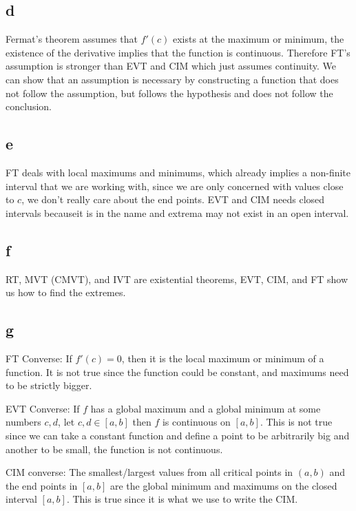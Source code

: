 \documentclass[12pt]{article}
\begin{document}
\subsection{d}
Fermat's theorem assumes that $f'(c)$ exists at the maximum or minimum, the existence of the derivative implies that the function is continuous. Therefore FT's assumption is stronger than EVT and CIM which just assumes continuity. We can show that an assumption is necessary by constructing a function that does not follow the assumption, but follows the hypothesis and does not follow the conclusion.

\subsection{e}
FT deals with local maximums and minimums, which already implies a non-finite interval that we are working with, since we are only concerned with values close to $c$, we don't really care about the end points. EVT and CIM needs closed intervals becauseit is in the name and extrema may not exist in an open interval.

\subsection{f}
RT, MVT (CMVT), and IVT are existential theorems, EVT, CIM, and FT show us how to find the extremes.

\subsection{g}
FT Converse: If $f'(c)=0$, then it is the local maximum or minimum of a function. It is not true since the function could be constant, and maximums need to be strictly bigger.

\newline
EVT Converse: If $f$ has a global maximum and a global minimum at some numbers $c,d$, let $c,d \in [a,b]$ then $f$ is continuous on $[a,b]$. This is not true since we can take a constant function and define a point to be arbitrarily big and another to be small, the function is not continuous.

\newline
CIM converse: The smallest/largest values from all critical points in $(a,b)$ and the end points in $[a,b]$ are the global minimum and maximums on the closed interval $[a,b]$. This is true since it is what we use to write the CIM.
\newpage
\end{document}
